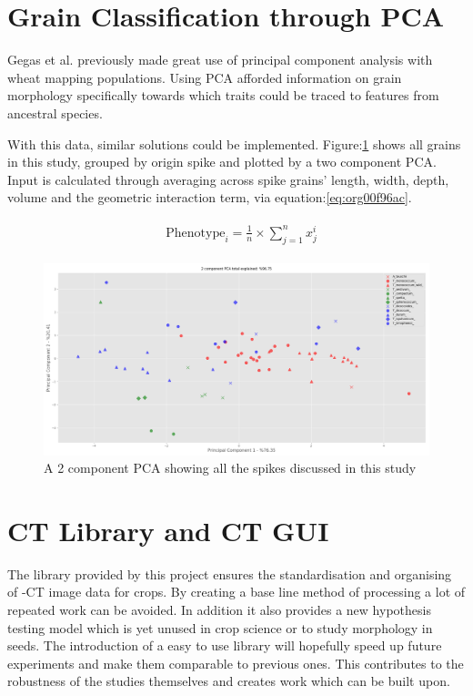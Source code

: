 \documentclass[11pt]{report}
\begin{document}
\section{Grain Classification through PCA}
\label{sec:org53cf320}
Gegas et al. previously made great use of principal component analysis with wheat mapping populations. Using PCA afforded information on grain morphology specifically towards which traits could be traced to features from ancestral species.

With this data, similar solutions could be implemented. Figure:\ref{fig:org155d9f5} shows all grains in this study, grouped by origin spike and plotted by a two component PCA. Input is calculated through averaging across spike grains' length, width, depth, volume and the geometric interaction term, via equation:\ref{eq:org00f96ac}.

 \begin{align}
\label{eq:org00f96ac}
   &\begin{aligned}
\text{Phenotype}_i = \frac{1}{n}\times\sum^n_{j=1}{x^i_j}
   \end{aligned}
 \end{align}


\begin{figure}[htbp]
\centering
\includegraphics[width=.9\linewidth]{./images/pca_all.png}
\caption{\label{fig:org155d9f5}
A 2 component PCA showing all the spikes discussed in this study}
\end{figure}

\section{CT Library and CT GUI}
\label{sec:org8b55b27}

The library provided by this project ensures the standardisation and organising of \textmu{}-CT image data for crops. By creating a base line method of processing a lot of repeated work can be avoided. In addition it also provides a new hypothesis testing model which is yet unused in crop science or to study morphology in seeds. The introduction of a easy to use library will hopefully speed up future experiments and make them comparable to previous ones. This contributes to the robustness of the studies themselves and creates work which can be built upon.
\end{document}
